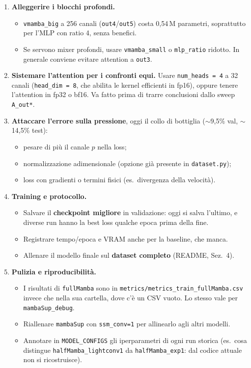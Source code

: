 \documentclass[11pt,a4paper]{article}
\newcommand{\cfg}[1]{\texttt{#1}}
\begin{document}
\begin{enumerate}
  \item \textbf{Alleggerire i blocchi profondi.}
  \begin{itemize}
    \item \cfg{vmamba\_big} a 256 canali (\cfg{out4}/\cfg{out5}) costa 0,54\,M parametri, soprattutto per l'MLP con ratio 4, senza benefici.
    \item Se servono mixer profondi, usare \cfg{vmamba\_small} o \cfg{mlp\_ratio} ridotto. In generale conviene evitare attention a \cfg{out3}.
  \end{itemize}
  \item \textbf{Sistemare l'attention per i confronti equi.} Usare \cfg{num\_heads = 4} a 32 canali (\cfg{head\_dim = 8}, che abilita le kernel efficienti in fp16), oppure tenere l'attention in fp32 o bf16. Va fatto prima di trarre conclusioni dallo sweep \cfg{A\_out*}.
  \item \textbf{Attaccare l'errore sulla pressione}, oggi il collo di bottiglia ($\sim$9,5\% val, $\sim$14,5\% test):
  \begin{itemize}
    \item pesare di più il canale $p$ nella loss;
    \item normalizzazione adimensionale (opzione già presente in \cfg{dataset.py});
    \item loss con gradienti o termini fisici (es.\ divergenza della velocità).
  \end{itemize}
  \item \textbf{Training e protocollo.}
  \begin{itemize}
    \item Salvare il \textbf{checkpoint migliore} in validazione: oggi si salva l'ultimo, e diverse run hanno la best loss qualche epoca prima della fine.
    \item Registrare tempo/epoca e VRAM anche per la baseline, che manca.
    \item Allenare il modello finale sul \textbf{dataset completo} (README, Sez.~4).
  \end{itemize}
  \item \textbf{Pulizia e riproducibilità.}
  \begin{itemize}
    \item I risultati di \cfg{fullMamba} sono in \cfg{metrics/metrics\_train\_fullMamba.csv} invece che nella sua cartella, dove c'è un CSV vuoto. Lo stesso vale per \cfg{mambaSup\_debug}.
    \item Riallenare \cfg{mambaSup} con \cfg{ssm\_conv=1} per allinearlo agli altri modelli.
    \item Annotare in \cfg{MODEL\_CONFIGS} gli iperparametri di ogni run storica (es.\ cosa distingue \cfg{halfMamba\_lightconv1} da \cfg{halfMamba\_exp1}: dal codice attuale non si ricostruisce).
  \end{itemize}
\end{enumerate}
\end{document}

